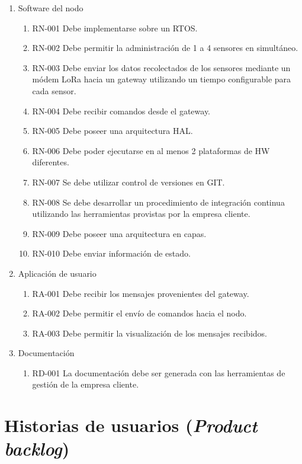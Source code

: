 \documentclass[11pt]{charter}
\begin{document}
\begin{enumerate}
\item Software del nodo
	\begin{enumerate}
	\item RN-001 Debe implementarse sobre un RTOS.
	\item RN-002 Debe permitir la administración de 1 a 4 sensores en simultáneo.
	\item RN-003 Debe enviar los datos recolectados de los sensores mediante un módem LoRa hacia un gateway utilizando un tiempo configurable para cada sensor.
	\item RN-004 Debe recibir comandos desde el gateway.
	\item RN-005 Debe poseer una arquitectura HAL.
	\item RN-006 Debe poder ejecutarse en al menos 2 plataformas de HW diferentes.
	\item RN-007 Se debe utilizar control de versiones en GIT.
	\item RN-008 Se debe desarrollar un procedimiento de integración continua utilizando las herramientas provistas por la empresa cliente.
	\item RN-009 Debe poseer una arquitectura en capas.
	\item RN-010 Debe enviar información de estado.
	\end{enumerate}
\item Aplicación de usuario
	\begin{enumerate}
	\item RA-001 Debe recibir los mensajes provenientes del gateway.
	\item RA-002 Debe permitir el envío de comandos hacia el nodo.
	\item RA-003 Debe permitir la visualización de los mensajes recibidos.
	\end{enumerate}
\item Documentación
	\begin{enumerate}
	\item RD-001 La documentación debe ser generada con las herramientas de gestión de la empresa cliente.
	\end{enumerate}
\end{enumerate}

\section{Historias de usuarios (\textit{Product backlog})}
\label{sec:backlog}
\end{document}
